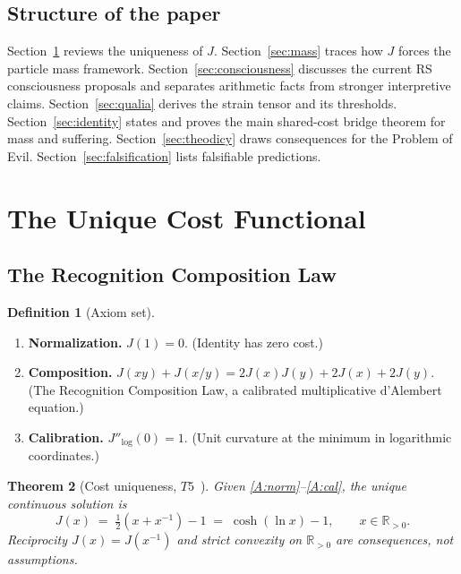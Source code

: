 \documentclass[11pt,a4paper]{article}
\theoremstyle{plain}
\newtheorem{theorem}{Theorem}[section]
\theoremstyle{definition}
\newtheorem{definition}[theorem]{Definition}
\theoremstyle{remark}
\newcommand{\Rp}{\mathbb{R}_{>0}}
\newcommand{\Jcost}{J}
\begin{document}
\subsection{Structure of the paper}

Section~\ref{sec:cost} reviews the uniqueness of $\Jcost$.
Section~\ref{sec:mass} traces how $\Jcost$ forces the particle mass
framework.  Section~\ref{sec:consciousness} discusses the current RS
consciousness proposals and separates arithmetic facts from stronger
interpretive claims.  Section~\ref{sec:qualia} derives the strain tensor
and its thresholds.  Section~\ref{sec:identity} states and proves the
main shared-cost bridge theorem for mass and suffering.
Section~\ref{sec:theodicy} draws consequences for the Problem of Evil.
Section~\ref{sec:falsification} lists falsifiable predictions.

\section{The Unique Cost Functional}
\label{sec:cost}

\subsection{The Recognition Composition Law}

\begin{definition}[Axiom set]
\label{def:axioms}
\begin{enumerate}[nosep, label=\textup{(A\arabic*)}]
\item \textbf{Normalization.} $\Jcost(1) = 0$.  (Identity has zero cost.)
      \label{A:norm}
\item \textbf{Composition.} $\Jcost(xy) + \Jcost(x/y)
      = 2\Jcost(x)\Jcost(y) + 2\Jcost(x) + 2\Jcost(y)$.
      (The Recognition Composition Law, a calibrated multiplicative
      d'Alembert equation.)
      \label{A:RCL}
\item \textbf{Calibration.} $\Jcost''_{\log}(0) = 1$.
      (Unit curvature at the minimum in logarithmic coordinates.)
      \label{A:cal}
\end{enumerate}
\end{definition}

\begin{theorem}[Cost uniqueness, $T5$~\cite{WashburnCost2026}]
\label{thm:T5}
Given \ref{A:norm}--\ref{A:cal}, the unique continuous solution is
\begin{equation}
\label{eq:J}
  \Jcost(x) \;=\; \tfrac{1}{2}(x + x^{-1}) - 1
  \;=\; \cosh(\ln x) - 1, \qquad x \in \Rp.
\end{equation}
Reciprocity $\Jcost(x) = \Jcost(x^{-1})$ and strict convexity on
$\Rp$ are \emph{consequences}, not assumptions.
\end{theorem}
\end{document}
